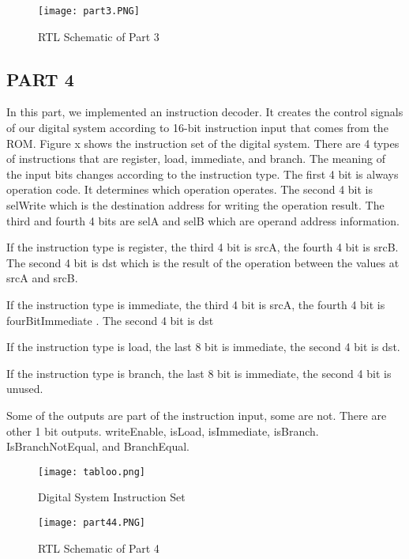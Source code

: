 \documentclass[pdftex,12pt,a4paper]{article}
\begin{document}
\begin{figure}[ht]
	\centering
	\texttt{[image: part3.PNG]}	
	\caption{RTL Schematic of Part 3}
	\label{fig1}
\end{figure}

\clearpage

\subsection{PART 4}

In this part, we implemented an instruction decoder. It creates the control signals of our digital system according to 16-bit instruction input that comes from the ROM. Figure x shows the instruction set of the digital system. There are 4 types of instructions that are register, load, immediate, and branch. The meaning of the input bits changes according to the instruction type. The first 4 bit is always operation code. It determines which operation operates. The second 4 bit is selWrite which is the destination address for writing the operation result. The third and fourth 4 bits are selA and selB which are operand address information.

If the instruction type is register, the third 4 bit is srcA, the fourth 4 bit is srcB. The second 4 bit is dst which is the result of the operation between the values at srcA and srcB. 

If the instruction type is immediate, the third 4 bit is srcA, the fourth 4 bit is fourBitImmediate . The second 4 bit is dst

If the instruction type is load, the last 8 bit is immediate, the second 4 bit is dst. 

If the instruction type is branch, the last 8 bit is immediate, the second 4 bit is unused. 

Some of the outputs are part of the instruction input, some are not. There are other 1 bit outputs. writeEnable, isLoad, isImmediate, isBranch. IsBranchNotEqual, and BranchEqual. 

\begin{figure}[ht]
	\centering
	\texttt{[image: tabloo.png]}	
	\caption{Digital System Instruction Set}
	\label{fig1}
\end{figure}

\begin{figure}[ht]
	\centering
	\texttt{[image: part44.PNG]}	
	\caption{RTL Schematic of Part 4}
	\label{fig1}
\end{figure}
\end{document}
